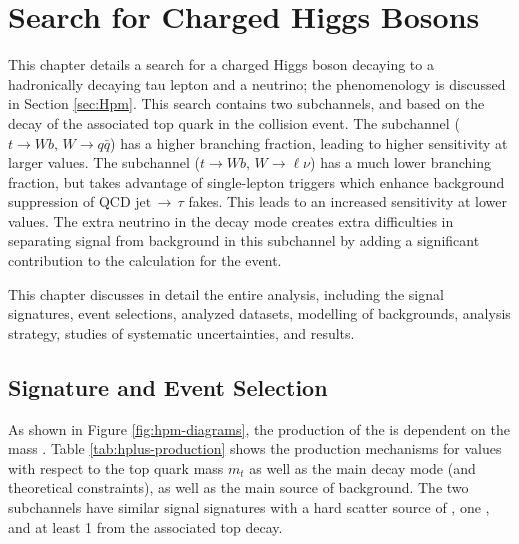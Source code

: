 \chapter{Search for Charged Higgs Bosons}\label{chap:hpana}
	This chapter details a search for a charged Higgs boson decaying to a hadronically decaying tau lepton and a neutrino; the phenomenology is discussed in Section \ref{sec:Hpm}. This search contains two subchannels, \taujets and \taulep based on the decay of the  associated top quark in the collision event. The \taujets subchannel ($t\rightarrow Wb, \, W \rightarrow q\bar{q}$)  has a higher branching fraction, leading to higher sensitivity at larger \mHpm values. The \taulep subchannel ($t\rightarrow Wb, \, W \rightarrow \ell \nu$)  has a much lower branching fraction, but takes advantage of single-lepton triggers which enhance background suppression of QCD $\mathrm{jet} \, \rightarrow \, \tau$ fakes. This leads to an increased sensitivity at lower \mHpm values. The extra neutrino in the \taulep decay mode creates extra difficulties in separating signal from background in this subchannel by adding a significant contribution to the \Etm calculation for the event. 

	This chapter discusses in detail the entire analysis, including the signal signatures, event selections, analyzed datasets, modelling of backgrounds, analysis strategy, studies of systematic uncertainties, and results.

	\section{Signature and Event Selection}\label{sec:signal}
		As shown in Figure \ref{fig:hpm-diagrams}, the production of the \Hpm is dependent on the mass \mHpm. Table \ref{tab:hplus-production} shows the production mechanisms for \mHpm values with respect to the top quark mass $m_t$ as well as the main decay mode (and theoretical constraints), as well as the main source of background. The two subchannels have similar signal signatures with a hard scatter source of \Etm, one \tauhad, and at least 1 \bjet from the associated top decay.

